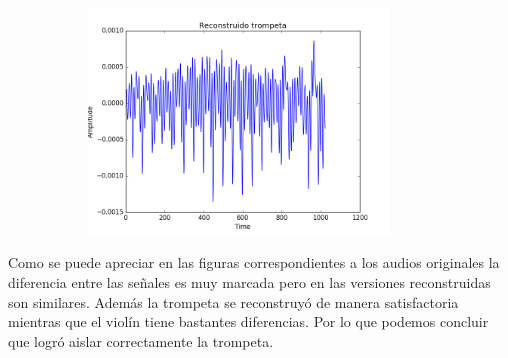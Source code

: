 \begin{figure}[h]
\begin{subfigure}{.5\textwidth}
        \centering
        \includegraphics[height=60mm]{Content/Figures/recons_tromp.png}
    \end{subfigure}
\end{figure}

Como se puede apreciar en las figuras correspondientes a los audios originales la diferencia entre las señales es muy marcada pero en las versiones reconstruidas son similares. Además la trompeta se reconstruyó de manera satisfactoria mientras que el violín tiene bastantes diferencias. Por lo que podemos concluir que logró aislar correctamente la trompeta.
